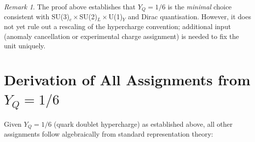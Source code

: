 \documentclass[12pt,a4paper]{article}
\theoremstyle{definition}
\theoremstyle{remark}
\newtheorem{remark}[theorem]{Remark}
\begin{document}
\begin{remark}
The proof above establishes that $Y_Q = 1/6$ is the \emph{minimal} choice
consistent with SU(3)$_c\times$SU(2)$_L\times$U(1)$_Y$ and Dirac quantisation.
However, it does not yet rule out a rescaling of the hypercharge convention;
additional input (anomaly cancellation or experimental charge assignment)
is needed to fix the unit uniquely.
\end{remark}

\section{Derivation of All Assignments from $Y_Q = 1/6$}
\label{sec:assignments}

Given $Y_Q = 1/6$ (quark doublet hypercharge) as established above, all
other assignments follow algebraically from standard representation theory:
\end{document}
